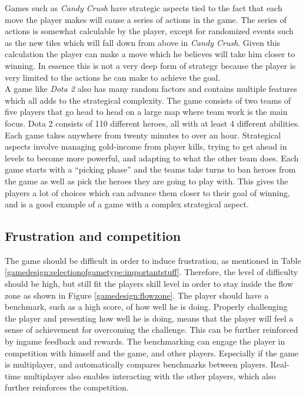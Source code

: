 Games such as \textit{Candy Crush}\cite{candycrush} have strategic aspects tied to the fact that each move the player makes will cause a series of actions in the game.
The series of actions is somewhat calculable by the player, except for randomized events such as the new tiles which will fall down from above in \textit{Candy Crush}.
Given this calculation the player can make a move which he believes will take him closer to winning.
In essence this is not a very deep form of strategy because the player is very limited to the actions he can make to achieve the goal.\\
A game like \textit{Dota 2}\cite{Dota2} also has many random factors and contains multiple features which all adds to the strategical complexity.
The game consists of two teams of five players that go head to head on a large map where team work is the main focus.
Dota 2 consists of 110 different heroes, all with at least 4 different abilities.
Each game takes anywhere from twenty minutes to over an hour.
Strategical aspects involve managing gold-income from player kills, trying to get ahead in levels to become more powerful, and adapting to what the other team does.
Each game starts with a ``picking phase'' and the teams take turns to ban heroes from the game as well as pick the heroes they are going to play with.
This gives the players a lot of choices which can advance them closer to their goal of winning, and is a good example of a game with a complex strategical aspect.

\subsection{Frustration and competition}\label{selectionofgametype:frustration}
The game should be difficult in order to induce frustration, as mentioned in Table \ref{gamedesign:selectionofgametype:importantstuff}.
Therefore, the level of difficulty should be high, but still fit the players skill level in order to stay inside the flow zone as shown in Figure \ref{gamedesign:flowzone}.
The player should have a benchmark, such as a high score, of how well he is doing.
Properly challenging the player and presenting how well he is doing, means that the player will feel a sense of achievement for overcoming the challenge.
This can be further reinforced by ingame feedback and rewards.
The benchmarking can engage the player in competition with himself and the game, and other players.
Especially if the game is multiplayer, and automatically compares benchmarks between players.
Real-time multiplayer also enables interacting with the other players, which also further reinforces the competition.

